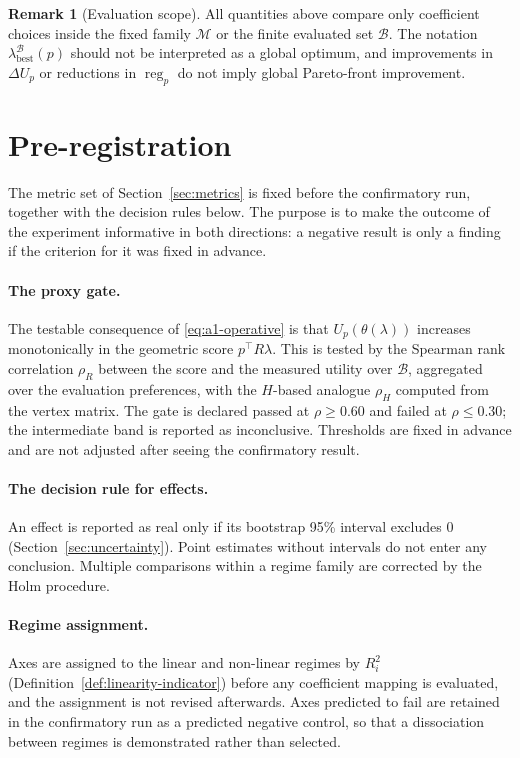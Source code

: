 \documentclass[12pt,a4paper]{report}
\newcommand{\1}{\mathbf{1}}
\newcommand{\Bset}{\mathcal{B}}
\newcommand{\Mfam}{\mathcal{M}}
\DeclareMathOperator{\reg}{reg}
\theoremstyle{definition}
\newtheorem{remark}[definition]{Remark}
\begin{document}
\begin{remark}[Evaluation scope]
\label{rem:eval-scope}
All quantities above compare only coefficient choices inside the fixed family \(\Mfam\) or the finite evaluated set \(\Bset\). The notation \(\lambda_{\mathrm{best}}^{\Bset}(p)\) should not be interpreted as a global optimum, and improvements in \(\Delta U_p\) or reductions in \(\reg_p\) do not imply global Pareto-front improvement.
\end{remark}

\section{Pre-registration}
\label{sec:prereg}

The metric set of Section~\ref{sec:metrics} is fixed before the confirmatory run, together with the decision rules below. The purpose is to make the outcome of the experiment informative in both directions: a negative result is only a finding if the criterion for it was fixed in advance.

\paragraph{The proxy gate.} The testable consequence of \eqref{eq:a1-operative} is that \(U_p(\theta(\lambda))\) increases monotonically in the geometric score \(p^\top R\lambda\). This is tested by the Spearman rank correlation \(\rho_R\) between the score and the measured utility over \(\Bset\), aggregated over the evaluation preferences, with the \(H\)-based analogue \(\rho_H\) computed from the vertex matrix. The gate is declared passed at \(\rho\ge 0.60\) and failed at \(\rho\le 0.30\); the intermediate band is reported as inconclusive. Thresholds are fixed in advance and are not adjusted after seeing the confirmatory result.

\paragraph{The decision rule for effects.} An effect is reported as real only if its bootstrap 95\% interval excludes \(0\) (Section~\ref{sec:uncertainty}). Point estimates without intervals do not enter any conclusion. Multiple comparisons within a regime family are corrected by the Holm procedure.

\paragraph{Regime assignment.} Axes are assigned to the linear and non-linear regimes by \(R^2_i\) (Definition~\ref{def:linearity-indicator}) before any coefficient mapping is evaluated, and the assignment is not revised afterwards. Axes predicted to fail are retained in the confirmatory run as a predicted negative control, so that a dissociation between regimes is demonstrated rather than selected.
\end{document}
